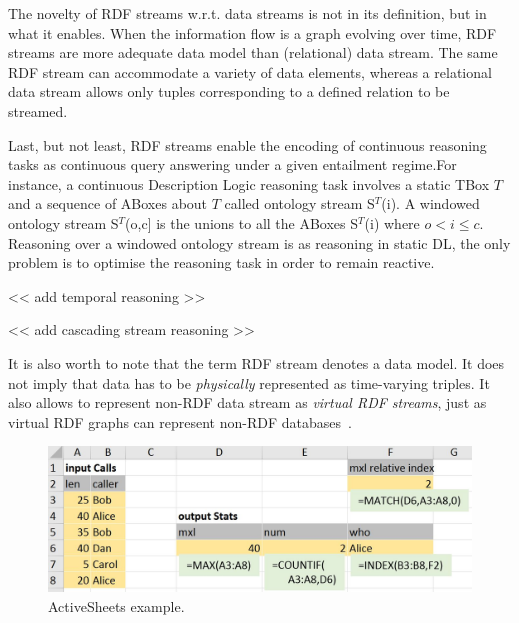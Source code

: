 The novelty of RDF streams w.r.t. data streams is not in its definition, but in what it enables. When the information flow is a graph evolving over time, RDF streams are more adequate data model than (relational) data stream. The same RDF stream can accommodate a variety of data elements, whereas a relational data stream allows only tuples corresponding to a defined relation to be streamed. 

Last, but not least, RDF streams enable the encoding of continuous reasoning tasks as continuous query answering under a given entailment regime.For instance, a continuous Description Logic reasoning task involves 
a static TBox $T$ and a sequence of ABoxes about $T$ called
ontology stream S$^T$(i).
A windowed ontology stream S$^T$(o,c] is the unions to all the ABoxes
S$^T$(i) where $o<i\leq c$.
Reasoning over a windowed ontology stream is as reasoning in static DL, the only problem is to optimise the reasoning task in order to remain reactive\cite{Ren2011,DBLP:conf/debs/KomazecCF12,DBLP:books/crc/linked14/DellAglioV14}.

<< add temporal reasoning >>

<< add cascading stream reasoning >>

\sloppy  It is also worth to note that the term RDF stream denotes a data model. It does not imply that data has to be \emph{physically} represented as time-varying triples. It also allows to represent non-RDF data stream as \emph{virtual RDF streams}, just as virtual RDF graphs can represent non-RDF databases~\cite{bizer2004d2rq}. 





\begin{figure}[!h]
\centerline{\includegraphics[width=\columnwidth]{CallStats.jpg}}
\vspace*{-4mm}
\caption{\label{fig:activesheets}ActiveSheets example.}
\end{figure}

